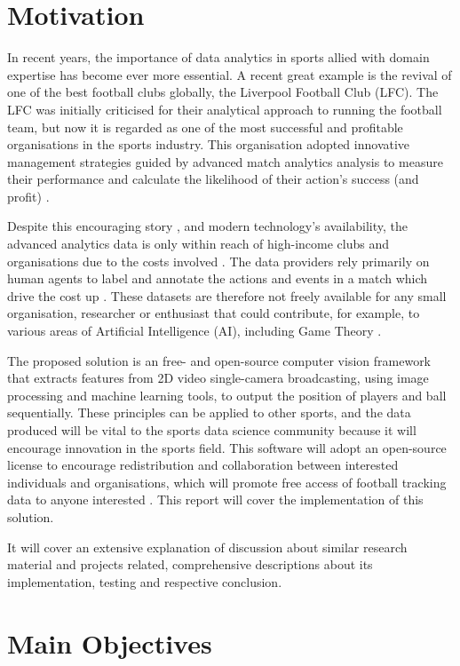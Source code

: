 \documentclass[
11pt,
twoside
]{report}
\begin{document}
\section{Motivation}


In recent years, the importance of data analytics in sports allied with domain expertise has become ever more essential. A recent great example is the revival of one of the best football clubs globally, the Liverpool Football Club (LFC). The LFC was initially criticised for their analytical approach to running the football team, but now it is regarded as one of the most successful and profitable organisations in the sports industry. This organisation adopted innovative management strategies guided by advanced match analytics analysis to measure their performance and calculate the likelihood of their action's success (and profit) \cite{liverpool}.


Despite this encouraging story \cite{liverpool}, and modern technology's availability, the advanced analytics data is only within reach of high-income clubs and organisations due to the costs involved \cite{opta}. The data providers rely primarily on human agents to label and annotate the actions and events in a match which drive the cost up \cite{opta}. These datasets are therefore not freely available for any small organisation, researcher or enthusiast that could contribute, for example, to various areas of Artificial Intelligence (AI), including Game Theory \cite{deepmind}.


The proposed solution is an free- and open-source computer vision framework that extracts features from 2D video single-camera broadcasting, using image processing and machine learning tools, to output the position of players and ball sequentially. These principles can be applied to other sports, and the data produced will be vital to the sports data science community because it will encourage innovation in the sports field. This software will adopt an open-source license to encourage redistribution and collaboration between interested individuals and organisations, which will promote free access of football tracking data to anyone interested \cite{osd}.  This report will cover the implementation of this solution.


It will cover an extensive explanation of  discussion about similar research material and projects related, comprehensive descriptions about its implementation, testing and respective conclusion.



\section{Main Objectives}
\end{document}
